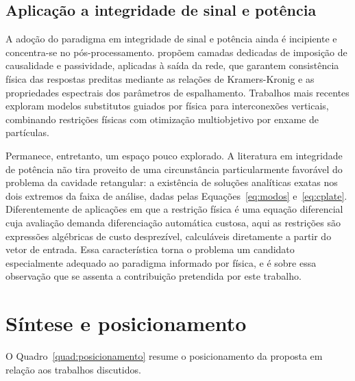 \subsection{Aplicação a integridade de sinal e potência}

A adoção do paradigma em integridade de sinal e potência ainda é incipiente e
concentra-se no pós-processamento. \citet{torun2020} propõem camadas
dedicadas de imposição de causalidade e passividade, aplicadas à saída da rede,
que garantem consistência física das respostas preditas mediante as relações de
Kramers-Kronig e as propriedades espectrais dos parâmetros de espalhamento.
Trabalhos mais recentes exploram modelos substitutos guiados por física para
interconexões verticais, combinando restrições físicas com otimização
multiobjetivo por enxame de partículas.

Permanece, entretanto, um espaço pouco explorado. A literatura em integridade de
potência não tira proveito de uma circunstância particularmente favorável do
problema da cavidade retangular: a existência de soluções analíticas exatas nos
dois extremos da faixa de análise, dadas pelas Equações~\ref{eq:modos}
e~\ref{eq:cplate}. Diferentemente de aplicações em que a restrição física é uma
equação diferencial cuja avaliação demanda diferenciação automática custosa,
aqui as restrições são expressões algébricas de custo desprezível, calculáveis
diretamente a partir do vetor de entrada. Essa característica torna o problema um
candidato especialmente adequado ao paradigma informado por física, e é sobre
essa observação que se assenta a contribuição pretendida por este trabalho.

\section{Síntese e posicionamento}
\label{sec:sintese}

O Quadro~\ref{quad:posicionamento} resume o posicionamento da proposta em relação
aos trabalhos discutidos.


